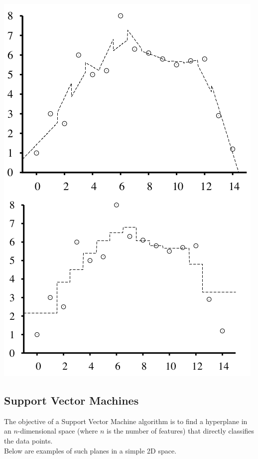 \documentclass[english, 10pt]{article}
\begin{document}
{
\centering

\includegraphics[scale=0.3]{img/knnregression.png}

}

\subsection{Support Vector Machines}

The objective of a Support Vector Machine algorithm is to find a hyperplane in an $n$-dimensional space (where $n$ is the number of features) that directly classifies the data points.\\

Below are examples of such planes in a simple 2D space.\\
\end{document}
